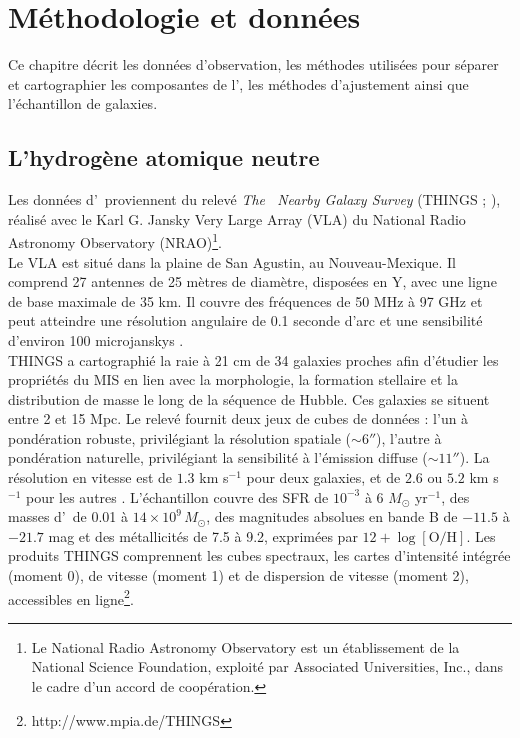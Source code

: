 \chapter[Méthodologie et données]{Méthodologie et données}

Ce chapitre décrit les données d'observation, les méthodes utilisées pour séparer et cartographier les composantes de l'\HI, les méthodes d'ajustement ainsi que l'échantillon de galaxies.

\section{L'hydrogène atomique neutre}

Les données d'\HI\ proviennent du relevé \textit{The \HI\ Nearby Galaxy Survey} (THINGS ; \citealt{things}), réalisé avec le Karl G. Jansky Very Large Array (VLA) du National Radio Astronomy Observatory (NRAO)\footnote{Le National Radio Astronomy Observatory est un établissement de la National Science Foundation, exploité par Associated Universities, Inc., dans le cadre d'un accord de coopération.}.\\\indent
Le VLA est situé dans la plaine de San Agustin, au Nouveau-Mexique. Il comprend 27 antennes de 25 mètres de diamètre, disposées en Y, avec une ligne de base maximale de 35 km. Il couvre des fréquences de 50 MHz à 97 GHz et peut atteindre une résolution angulaire de 0.1 seconde d'arc et une sensibilité d'environ 100 microjanskys \citep{vla1980}.\\\indent
THINGS a cartographié la raie à 21 cm de 34 galaxies proches afin d'étudier les propriétés du MIS en lien avec la morphologie, la formation stellaire et la distribution de masse le long de la séquence de Hubble. Ces galaxies se situent entre 2 et 15 Mpc. Le relevé fournit deux jeux de cubes de données : l'un à pondération robuste, privilégiant la résolution spatiale ($\sim 6''$), l'autre à pondération naturelle, privilégiant la sensibilité à l'émission diffuse ($\sim 11''$). La résolution en vitesse est de $1.3$ km s$^{-1}$ pour deux galaxies, et de $2.6$ ou $5.2$ km s$^{-1}$ pour les autres \citep{Walter2008}. L'échantillon couvre des SFR de $10^{-3}$ à 6 $M_\odot$ yr$^{-1}$, des masses d'\HI\ de 0.01 à $14 \times 10^9\,M_\odot$, des magnitudes absolues en bande B de $-11.5$ à $-21.7$ mag et des métallicités de 7.5 à 9.2, exprimées par $12 + \log[\mathrm{O/H}]$. Les produits THINGS comprennent les cubes spectraux, les cartes d'intensité intégrée (moment 0), de vitesse (moment 1) et de dispersion de vitesse (moment 2), accessibles en ligne\footnote{http://www.mpia.de/THINGS}.\\\indent
